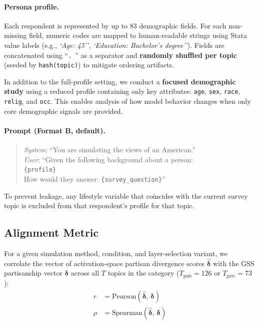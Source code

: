 \paragraph{Persona profile.} Each respondent is represented by up to 83 demographic fields. For each non-missing field, numeric codes are mapped to human-readable strings using Stata value labels (e.g., \textit{`Age: 45''}, \textit{`Education: Bachelor’s degree''}). Fields are concatenated using ``\texttt{. }'' as a separator and \textbf{randomly shuffled per topic} (seeded by \texttt{hash(topic)}) to mitigate ordering artifacts.

In addition to the full-profile setting, we conduct a \textbf{focused demographic study} using a reduced profile containing only key attributes: \texttt{age}, \texttt{sex}, \texttt{race}, \texttt{relig}, and \texttt{occ}. This enables analysis of how model behavior changes when only core demographic signals are provided.

\paragraph{Prompt (Format B, default).}
\begin{quote}
\textit{System}: ``You are simulating the views of an American.''\\[2pt]
\textit{User}: ``Given the following background about a person:\\
\quad\texttt{\{profile\}}\\[2pt]
How would they answer: \texttt{\{survey\_question\}}''
\end{quote}

To prevent leakage, any lifestyle variable that coincides with the current survey topic is excluded from that respondent's profile for that topic.

\subsection{Alignment Metric}
\label{sec:alignment}

For a given simulation method, condition, and layer-selection variant, we correlate the vector of activation-space partisan divergence scores $\hat{\boldsymbol{\delta}}$ with the GSS partisanship vector $\boldsymbol{\delta}$ across all $T$ topics in the category ($T_\text{pub} = 126$ or $T_\text{priv} = 73$):
\begin{align}
    r &= \mathrm{Pearson}(\hat{\boldsymbol{\delta}},\, \boldsymbol{\delta}) \\
    \rho &= \mathrm{Spearman}(\hat{\boldsymbol{\delta}},\, \boldsymbol{\delta})
\end{align}

